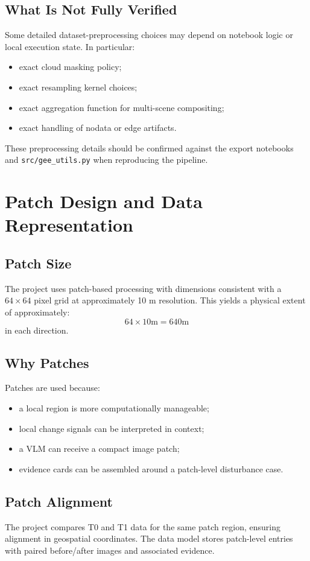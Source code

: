 \documentclass[11pt]{article}
\begin{document}
\subsection{What Is Not Fully Verified}
Some detailed dataset-preprocessing choices may depend on notebook logic or local execution state. In particular:
\begin{itemize}
    \item exact cloud masking policy;
    \item exact resampling kernel choices;
    \item exact aggregation function for multi-scene compositing;
    \item exact handling of nodata or edge artifacts.
\end{itemize}
These preprocessing details should be confirmed against the export notebooks and \texttt{src/gee\_utils.py} when reproducing the pipeline.

\section{Patch Design and Data Representation}

\subsection{Patch Size}
The project uses patch-based processing with dimensions consistent with a $64 \times 64$ pixel grid at approximately 10 m resolution. This yields a physical extent of approximately:
\[
64 \times 10\text{m} = 640\text{m}
\]
in each direction.

\subsection{Why Patches}
Patches are used because:
\begin{itemize}
    \item a local region is more computationally manageable;
    \item local change signals can be interpreted in context;
    \item a VLM can receive a compact image patch;
    \item evidence cards can be assembled around a patch-level disturbance case.
\end{itemize}

\subsection{Patch Alignment}
The project compares T0 and T1 data for the same patch region, ensuring alignment in geospatial coordinates. The data model stores patch-level entries with paired before/after images and associated evidence.
\end{document}
